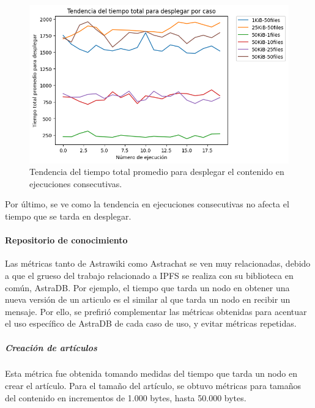 \begin{figure}[H]
    \centering
    \includegraphics[width=0.9\linewidth]{img/metricas-ipfs/tendencia-desplegar.png}
    \caption{Tendencia del tiempo total promedio para desplegar el contenido en ejecuciones consecutivas.}
    \label{fig:tendencia-desplegar.png}
\end{figure}

Por último, se ve como la tendencia en ejecuciones consecutivas no afecta el tiempo que se tarda en desplegar.

\paragraph{Repositorio de conocimiento}

Las métricas tanto de Astrawiki como Astrachat se ven muy relacionadas, debido a que el grueso del trabajo relacionado a IPFS se realiza con su biblioteca en común, AstraDB. Por ejemplo, el tiempo que tarda un nodo en obtener una nueva versión de un articulo es el similar al que tarda un nodo en recibir un mensaje. Por ello, se prefirió complementar las métricas obtenidas para acentuar el uso específico de AstraDB de cada caso de uso, y evitar métricas repetidas. 

\subparagraph{Creación de artículos}

Esta métrica fue obtenida tomando medidas del tiempo que tarda un nodo en crear el artículo. Para el tamaño del artículo, se obtuvo métricas para tamaños del contenido en incrementos de 1.000 bytes, hasta 50.000 bytes.

